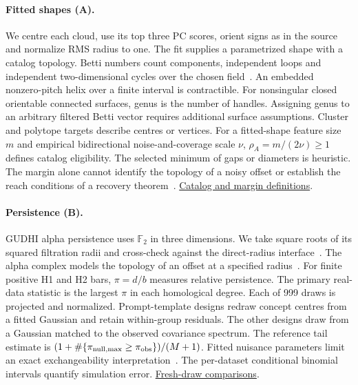 \documentclass[10pt]{article}
\newcommand{\evidence}[2]{\href{https://github.com/BurnyCoder/topology-of-neural-geometry-in-llm-mechanistic-interpretability/blob/main/#1}{#2}}
\begin{document}
\paragraph{Fitted shapes (A).}
We centre each cloud, use its top three PC scores, orient signs as in the source and normalize RMS radius to one. The fit supplies a parametrized shape with a catalog topology. Betti numbers count components, independent loops and independent two-dimensional cycles over the chosen field~\citep{hatcher2002algebraic}. An embedded nonzero-pitch helix over a finite interval is contractible. For nonsingular closed orientable connected surfaces, genus is the number of handles. Assigning genus to an arbitrary filtered Betti vector requires additional surface assumptions. Cluster and polytope targets describe centres or vertices. For a fitted-shape feature size $m$ and empirical bidirectional noise-and-coverage scale $\nu$, $\rho_A=m/(2\nu)\geq1$ defines catalog eligibility. The selected minimum of gaps or diameters is heuristic. The margin alone cannot identify the topology of a noisy offset or establish the reach conditions of a recovery theorem~\citep{niyogi2008finding}. \evidence{docs/analytic_topology.md}{Catalog and margin definitions}.

\paragraph{Persistence (B).}
GUDHI alpha persistence uses $\mathbb F_2$ in three dimensions. We take square roots of its squared filtration radii and cross-check against the direct-radius interface~\citep{gudhi}. The alpha complex models the topology of an offset at a specified radius~\citep{edelsbrunner1995union,bauer2017morse}. For finite positive H1 and H2 bars, $\pi=d/b$ measures relative persistence. The primary real-data statistic is the largest $\pi$ in each homological degree. Each of 999 draws is projected and normalized. Prompt-template designs redraw concept centres from a fitted Gaussian and retain within-group residuals. The other designs draw from a Gaussian matched to the observed covariance spectrum. The reference tail estimate is $(1+\#\{\pi_{\rm null,max}\geq\pi_{\rm obs}\})/(M+1)$. Fitted nuisance parameters limit an exact exchangeability interpretation~\citep{dufour2006}. The per-dataset conditional binomial intervals quantify simulation error. \evidence{results/science/null_replay.csv}{Fresh-draw comparisons}.
\end{document}
